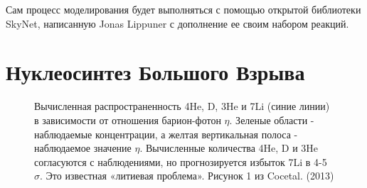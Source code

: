 \documentclass[%
master,    %
natbib,      %
subf,        %
href,        %
colorlinks,  %
]{disser}
\begin{document}
Сам процесс моделирования будет выполняться с помощью открытой библиотеки SkyNet, написанную Jonas Lippuner с дополнение ее своим набором реакций.

\section{Нуклеосинтез Большого Взрыва}

\begin{figure}[h]
	\caption{Вычисленная распространенность 4He, D, 3He и 7Li (синие линии) в зависимости от отношения барион-фотон $\eta$. Зеленые области - наблюдаемые концентрации, а желтая вертикальная полоса - наблюдаемое значение $\eta$. Вычисленные количества 4He, D и 3He согласуются с наблюдениями, но прогнозируется избыток 7Li в 4-5 $\sigma$. Это известная «литиевая проблема». Рисунок 1 из Cocetal. (2013)}
	\label{ris:Cocetal}
\end{figure}
\end{document}
